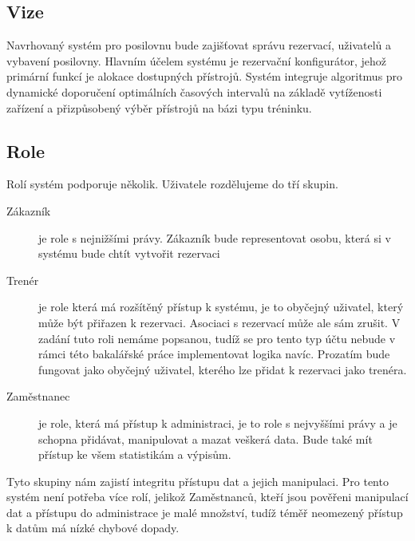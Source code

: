 \subsection{Vize}
Navrhovaný systém pro posilovnu bude zajišťovat správu rezervací, uživatelů a vybavení posilovny. Hlavním účelem systému je rezervační konfigurátor, jehož primární funkcí je alokace dostupných přístrojů. Systém integruje algoritmus pro dynamické doporučení optimálních časových intervalů na základě vytíženosti zařízení a přizpůsobený výběr přístrojů na bázi typu tréninku.

\subsection{Role}
Rolí systém podporuje několik. Uživatele rozdělujeme do tří skupin.

\begin{description}
    \item[Zákazník] je role s nejnižšími právy. Zákazník bude representovat osobu, která si v systému bude chtít vytvořit rezervaci
    \item[Trenér] je role která má rozšítěný přístup k systému, je to obyčejný uživatel, který může být přiřazen k rezervaci. Asociaci s rezervací může ale sám zrušit. V zadání tuto roli nemáme popsanou, tudíž se pro tento typ účtu nebude v rámci této bakalářské práce implementovat logika navíc. Prozatím bude fungovat jako obyčejný uživatel, kterého lze přidat k rezervaci jako trenéra.
    \item[Zaměstnanec] je role, která má přístup k administraci, je to role s nejvyššími právy a je schopna přidávat, manipulovat a mazat veškerá data. Bude také mít přístup ke všem statistikám a výpisům.
\end{description}
Tyto skupiny nám zajistí integritu přístupu dat a jejich manipulaci. Pro tento systém není potřeba více rolí, jelikož Zaměstnanců, kteří jsou pověřeni manipulací dat a přístupu do administrace je malé množství, tudíž téměř neomezený přístup k datům má nízké chybové dopady.

